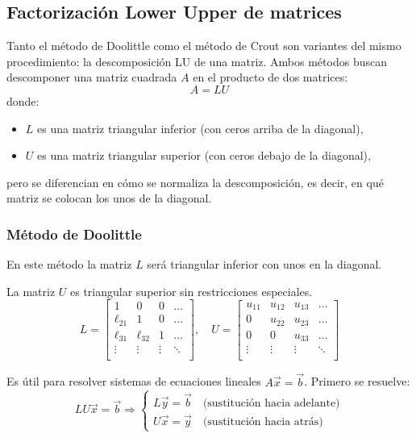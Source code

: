 \subsection{Factorización Lower Upper de matrices}

Tanto el método de Doolittle como el método de Crout son variantes del mismo procedimiento: la descomposición LU de una matriz. Ambos métodos buscan descomponer una matriz cuadrada \(A\) en el producto de dos matrices:
\[
A = LU
\]
donde:
\begin{itemize}
  \item \(L\) es una matriz triangular inferior (con ceros arriba de la diagonal),
  \item \(U\) es una matriz triangular superior (con ceros debajo de la diagonal),
\end{itemize}
pero se diferencian en cómo se normaliza la descomposición, es decir, en qué matriz se colocan los unos de la diagonal.

\subsubsection{Método de Doolittle}

En este método la matriz \(L\) será triangular inferior con unos en la diagonal.

La matriz \(U\) es triangular superior sin restricciones especiales.
\[
L = \begin{bmatrix}
1 & 0 & 0 & \dots \\
\ell_{21} & 1 & 0 & \dots \\
\ell_{31} & \ell_{32} & 1 & \dots \\
\vdots & \vdots & \vdots & \ddots \\
\end{bmatrix},
\quad
U = \begin{bmatrix}
u_{11} & u_{12} & u_{13} & \dots \\
0 & u_{22} & u_{23} & \dots \\
0 & 0 & u_{33} & \dots \\
\vdots & \vdots & \vdots & \ddots \\
\end{bmatrix}
\]

Es útil para resolver sistemas de ecuaciones lineales \(A\vec{x} = \vec{b}\).
Primero se resuelve:
\[
LU\vec{x} = \vec{b}
\Rightarrow
\begin{cases}
L\vec{y} = \vec{b} \quad \text{(sustitución hacia adelante)} \\
U\vec{x} = \vec{y} \quad \text{(sustitución hacia atrás)}
\end{cases}
\]


